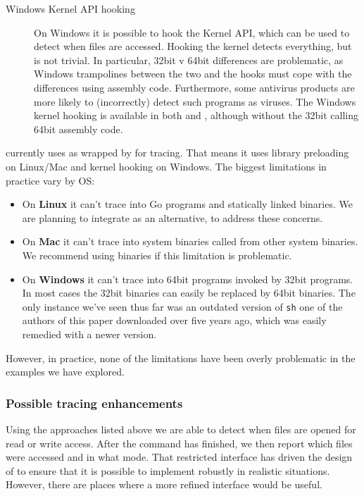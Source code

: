 \begin{description}
\item[Windows Kernel API hooking] On Windows it is possible to hook the Kernel API, which can be used to detect when files are accessed. Hooking the kernel detects everything, but is not trivial. In particular, 32bit v 64bit differences are problematic, as Windows trampolines between the two and the hooks must cope with the differences using assembly code. Furthermore, some antivirus products are more likely to (incorrectly) detect such programs as viruses. The Windows kernel hooking is available in both \Fsatrace and \libbigbro, although without the 32bit calling 64bit assembly code.
\end{description}

\Rattle currently uses \Fsatrace as wrapped by \Shake for tracing. That means it uses library preloading on Linux/Mac and kernel hooking on Windows. The biggest limitations in practice vary by OS:

\begin{itemize}
\item On \textbf{Linux} it can't trace into Go programs and statically linked binaries. We are planning to integrate \libbigbro as an alternative, to address these concerns.
\item On \textbf{Mac} it can't trace into system binaries called from other system binaries. We recommend using \Nix binaries if this limitation is problematic.
\item On \textbf{Windows} it can't trace into 64bit programs invoked by 32bit programs. In most cases the 32bit binaries can easily be replaced by 64bit binaries. The only instance we've seen thus far was an outdated version of \texttt{sh} one of the authors of this paper downloaded over five years ago, which was easily remedied with a newer version.
\end{itemize}

However, in practice, none of the limitations have been overly problematic in the examples we have explored.

\subsubsection{Possible tracing enhancements}

Using the approaches listed above we are able to detect when files are opened for read or write access. After the command has finished, we then report which files were accessed and in what mode. That restricted interface has driven the design of \Rattle to ensure that it is possible to implement \Rattle robustly in realistic situations. However, there are places where a more refined interface would be useful.

